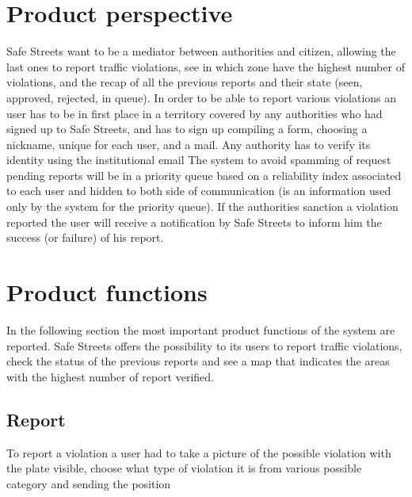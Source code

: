 \documentclass[12pt,a4paper]{report}
\begin{document}
	\section{Product perspective}
		Safe Streets want to be a mediator between authorities and citizen, allowing the last ones to report traffic violations, see
		in which zone have the highest number of violations, and the recap of all the previous reports and their state
		(seen, approved, rejected, in queue). In order to be able to report various violations an user has to be in first place in a
		territory covered by any authorities who had signed up to Safe Streets, and has to sign up compiling a form, choosing a
		nickname, unique for each user, and a mail. Any authority has to verify its identity using the institutional email 
		The system to avoid spamming of request pending reports will be in a priority queue based 
		on a reliability index associated to each user and hidden to both side of communication (is an information used only by 
		the system for the priority queue). If the authorities sanction a violation reported the user 
		will receive a notification by Safe Streets to inform him the success (or failure) of his report. 
	\section{Product functions}
		In the following section the most important product functions of the system are reported.
		Safe Streets offers the possibility to its users to report traffic violations, check the status of the previous reports and see 
		a map that indicates the areas with the highest number of report verified.
		\subsection{Report}
			To report a violation a user had to take a picture of the possible violation with the plate visible, choose what type of
			violation it is from various possible category and sending the position
\end{document}
